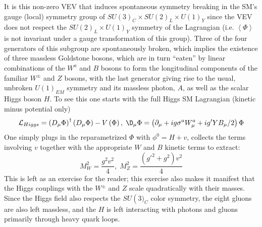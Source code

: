 It is this non-zero VEV that induces spontaneous symmetry breaking in the SM's gauge (local) symmetry group of $SU\left(3\right)_C\times SU\left(2\right)_L\times U\left(1\right)_Y$ since the VEV does not respect the $SU\left(2\right)_L\times U\left(1\right)_Y$ symmetry of the Lagrangian (i.e. $\left<\Phi\right>$ is not invariant under a gauge transformation of this group).  Three of the four generators of this subgroup are spontaneously broken, which implies the existence of three massless Goldstone bosons, which are in turn ``eaten'' by linear combinations of the $W^a$ and $B$ bosons to form the longitudinal components of the familiar $W^{\pm}$ and $Z$ bosons, with the last generator giving rise to the usual, unbroken $U\left(1\right)_{EM}$ symmetry and its massless photon, $A$, as well as the scalar Higgs boson $H$.  To see this one starts with the full Higgs SM Lagrangian (kinetic minus potential only)
\begin{equation}
\mathcal{L}_{Higgs}=\left(D_{\mu}\Phi\right)^\dagger\left(D_{\mu}\Phi\right)-V\left(\Phi\right),\; \D_{\mu}\Phi = \left(\partial_{\mu}+ig\sigma^a W^a_\mu + ig'YB_\mu/2\right)\Phi
\end{equation}
One simply plugs in the reparametrized $\Phi$ with $\phi^0=H+v$, collects the terms involving $v$ together with the appropriate $W$ and $B$ kinetic terms to extract:
\begin{equation}
M_W^2=\frac{g^2v^2}{4},\;M_Z^2=\frac{\left(g'^2+g^2\right)v^2}{4}
\end{equation}
This is left as an exercise for the reader; this exercise also makes it manifest that the Higgs couplings with the $W^\pm$ and $Z$ scale quadratically with their masses.  Since the Higgs field also respects the $SU\left(3)_C$ color symmetry, the eight gluons are also left massless, and the $H$ is left interacting with photons and gluons primarily through heavy quark loops.

